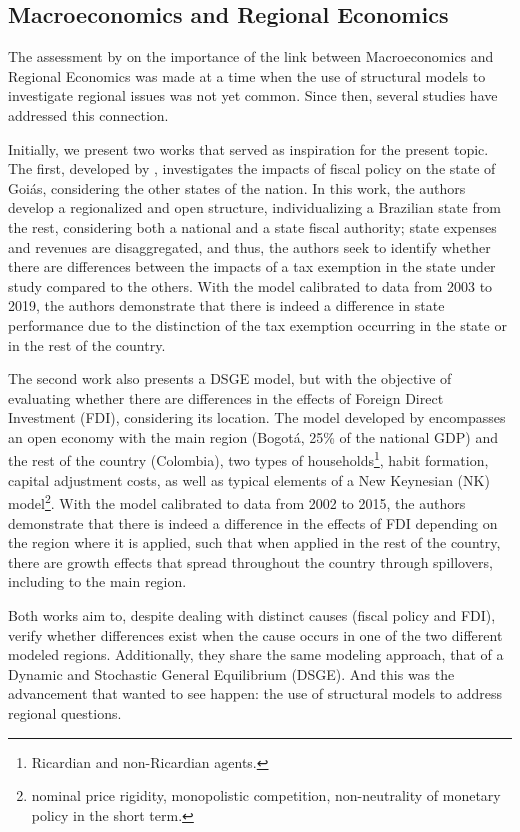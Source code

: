 \documentclass[
	thesis.tex
	]{subfiles}
\begin{document}
	\subsection*{Macroeconomics and Regional Economics}
	
	The assessment by \textcite{rickman_modern_2010} on the importance of the link between Macroeconomics and Regional Economics was made at a time when the use of structural models to investigate regional issues was not yet common. Since then, several studies have addressed this connection.
	
	Initially, we present two works that served as inspiration for the present topic. The first, developed by \textcite{costa_junior_dsge_2022}, investigates the impacts of fiscal policy on the state of Goiás, considering the other states of the nation. In this work, the authors develop a regionalized and open structure, individualizing a Brazilian state from the rest, considering both a national and a state fiscal authority; state expenses and revenues are disaggregated, and thus, the authors seek to identify whether there are differences between the impacts of a tax exemption in the state under study compared to the others. With the model calibrated to data from 2003 to 2019, the authors demonstrate that there is indeed a difference in state performance due to the distinction of the tax exemption occurring in the state or in the rest of the country.
	
	The second work also presents a DSGE model, but with the objective of evaluating whether there are differences in the effects of Foreign Direct Investment (FDI), considering its location. The model developed by \textcite{mora_fdi_2019} encompasses an open economy with the main region (Bogotá, 25\% of the national GDP) and the rest of the country (Colombia), two types of households\footnote{ Ricardian and non-Ricardian agents.}, habit formation, capital adjustment costs, as well as typical elements of a New Keynesian (NK) model\footnote{ nominal price rigidity, monopolistic competition, non-neutrality of monetary policy in the short term.}. With the model calibrated to data from 2002 to 2015, the authors demonstrate that there is indeed a difference in the effects of FDI depending on the region where it is applied, such that when applied in the rest of the country, there are growth effects that spread throughout the country through spillovers, including to the main region.
	
	Both works aim to, despite dealing with distinct causes (fiscal policy and FDI), verify whether differences exist when the cause occurs in one of the two different modeled regions. Additionally, they share the same modeling approach, that of a Dynamic and Stochastic General Equilibrium (DSGE). And this was the advancement that \textcite{rickman_modern_2010} wanted to see happen: the use of structural models to address regional questions.
	
\end{document}
